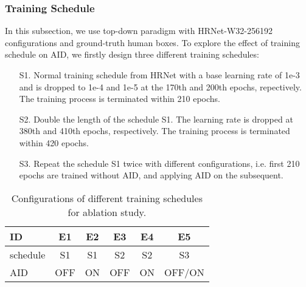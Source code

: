 \documentclass[final]{cvpr}
\begin{document}
\subsubsection{Training Schedule}
In this subsection, we use top-down paradigm with HRNet-W32-256192 configurations and ground-truth human boxes. To explore the effect of training schedule on AID, we firstly design three different training schedules:
\begin{itemize}
  \item [S1.]
  Normal training schedule from HRNet \cite{HRNet} with a base learning rate of 1e-3 and is dropped to 1e-4 and 1e-5 at the 170th and 200th epochs, repectively. The training process is terminated within 210 epochs.
  \item [S2.]
  Double the length of the schedule S1. The learning rate is dropped at 380th and 410th epochs, respectively. The training process is terminated within 420 epochs.
  \item [S3.]
  Repeat the schedule S1 twice with different configurations, i.e. first 210 epochs are trained without AID, and applying AID on the subsequent.
\end{itemize}


\begin{table}[h]
\footnotesize
\begin{center}
\begin{tabular}{l|c|c|c|c|c}

\hline
ID                              & E1    &E2   &E3 &E4 &E5        \\
\hline
schedule                        & S1    &S1   &S2 &S2 &S3\\
\hline
AID                             & OFF   &ON   &OFF&ON &OFF/ON  \\
\hline
\end{tabular}
\end{center}
\caption{Configurations of different training schedules for ablation study. }
\label{tab:config}
\end{table}
\end{document}
